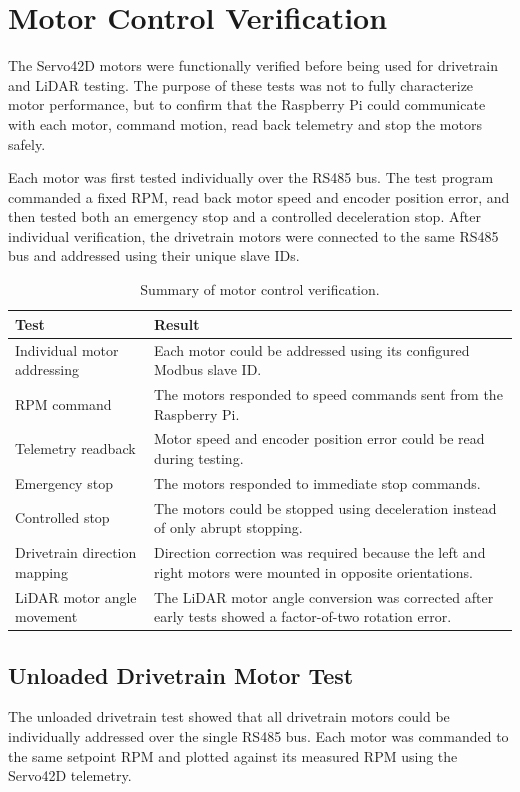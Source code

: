 \newpage
\section{Motor Control Verification}

The Servo42D motors were functionally verified before being used for drivetrain and LiDAR testing. The purpose of these tests was not to fully characterize motor performance, but to confirm that the Raspberry Pi could communicate with each motor, command motion, read back telemetry and stop the motors safely.

Each motor was first tested individually over the RS485 bus. The test program commanded a fixed RPM, read back motor speed and encoder position error, and then tested both an emergency stop and a controlled deceleration stop. After individual verification, the drivetrain motors were connected to the same RS485 bus and addressed using their unique slave IDs.

\begin{table}[H]
\centering
\caption{Summary of motor control verification.}
\begin{tabular}{p{} p{}}
\hline
Test & Result \\
\hline
Individual motor addressing & Each motor could be addressed using its configured Modbus slave ID. \\
RPM command & The motors responded to speed commands sent from the Raspberry Pi. \\
Telemetry readback & Motor speed and encoder position error could be read during testing. \\
Emergency stop & The motors responded to immediate stop commands. \\
Controlled stop & The motors could be stopped using deceleration instead of only abrupt stopping. \\
Drivetrain direction mapping & Direction correction was required because the left and right motors were mounted in opposite orientations. \\
LiDAR motor angle movement & The LiDAR motor angle conversion was corrected after early tests showed a factor-of-two rotation error. \\
\hline
\end{tabular}
\end{table}

\subsection{Unloaded Drivetrain Motor Test}
The unloaded drivetrain test showed that all drivetrain motors could be individually addressed over the single RS485 bus.
Each motor was commanded to the same setpoint RPM and plotted against its measured RPM using the Servo42D telemetry.

